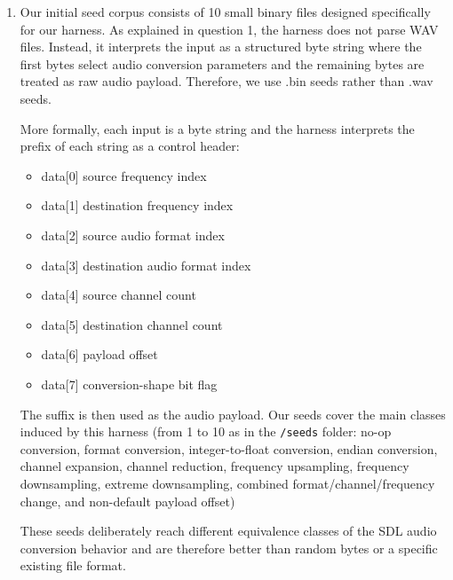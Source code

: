 \documentclass[letterpaper,twocolumn,10pt]{article}
\begin{document}
\begin{enumerate}
    \texttt{-g}: This flag just adds debugs symbols, which, as the description says, helps us debug.

    
    \item Our initial seed corpus consists of 10 small binary files designed specifically for our harness. As explained in question 1, the harness does not parse WAV files. Instead, it interprets the input as a structured byte string where the first bytes select audio conversion parameters and the remaining bytes are treated as raw audio payload. Therefore, we use .bin seeds rather than .wav seeds.

    More formally, each input is a byte string and the harness interprets the prefix of each string as a control header:
    \begin{itemize}
        \item data[0] \textrightarrow{} source frequency index
        \item data[1] \textrightarrow{} destination frequency index
        \item data[2] \textrightarrow{} source audio format index
        \item data[3] \textrightarrow{} destination audio format index
        \item data[4] \textrightarrow{} source channel count
        \item data[5] \textrightarrow{} destination channel count
        \item data[6] \textrightarrow{} payload offset
        \item data[7] \textrightarrow{} conversion-shape bit flag
    \end{itemize}

    The suffix is then used as the audio payload. Our seeds cover the main classes induced by this harness (from 1 to 10 as in the \texttt{/seeds} folder: no-op conversion, format conversion, integer-to-float conversion, endian conversion, channel expansion, channel reduction, frequency upsampling, frequency downsampling, extreme downsampling, combined format/channel/frequency change, and non-default payload offset)

    These seeds deliberately reach different equivalence classes of the SDL audio conversion behavior and are therefore better than random bytes or a specific existing file format.


\end{enumerate}
\end{document}
